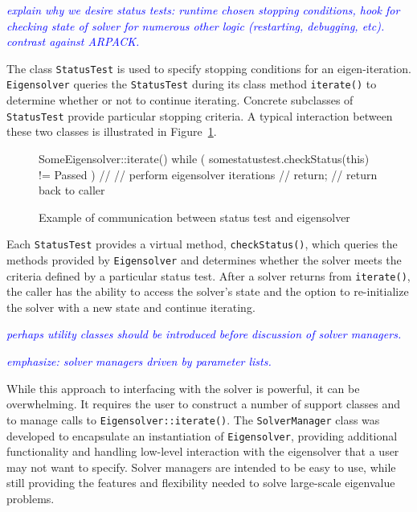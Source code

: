 \documentclass[acmtoms]{acmtrans2m}
\newcommand{\aspace}[1]{\texttt{#1}}
\newcommand{\cbcomm}[1]{\textcolor{blue}{\emph{#1}}}
\begin{document}
\cbcomm{explain why we desire status tests: runtime chosen stopping
conditions, hook for checking state of solver for numerous other logic
(restarting, debugging, etc). contrast against ARPACK.}

The class \aspace{StatusTest} is used to specify stopping conditions for an
eigen-iteration. \aspace{Eigensolver} queries the \aspace{StatusTest} during its class
method \aspace{iterate()} to determine whether or not to continue iterating. Concrete
subclasses of \aspace{StatusTest} provide particular stopping criteria. A typical
interaction between these two classes is illustrated in Figure~\ref{fig:comm}.

\begin{figure}[htb]
\begin{center}
\begin{boxedverbatim}
SomeEigensolver::iterate() {
  while ( somestatustest.checkStatus(this) != Passed ) {
    //
    // perform eigensolver iterations
    //
  }
  return;  // return back to caller
}
\end{boxedverbatim}
\end{center}
\caption{Example of communication between status test and eigensolver}
\label{fig:comm}
\end{figure}

Each \aspace{StatusTest} provides a virtual method,
\verb!checkStatus()!, which queries the methods provided by
\aspace{Eigensolver} and determines whether the solver meets the
criteria defined by a particular status test. After a solver returns
from \verb!iterate()!, the caller has the ability to access the
solver's state and the option to re-initialize the solver with a new
state and continue iterating.

\cbcomm{perhaps utility classes should be introduced before discussion
of solver managers.}

\cbcomm{emphasize: solver managers driven by parameter lists.}

While this approach to interfacing with the solver is powerful, it can be overwhelming. It
requires the user to construct a number of support classes and to manage calls to
\verb!Eigensolver::iterate()!. The \aspace{SolverManager} class was developed to
encapsulate an instantiation of \aspace{Eigensolver}, providing additional functionality
and handling low-level interaction with the eigensolver that a user may not want to
specify. Solver managers are intended to be easy to use, while still providing the
features and flexibility needed to solve large-scale eigenvalue problems.
\end{document}

